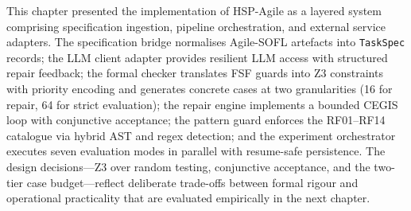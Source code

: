 This chapter presented the implementation of HSP-Agile as a layered system
comprising specification ingestion, pipeline orchestration, and external
service adapters.  The specification bridge normalises Agile-SOFL artefacts
into \texttt{TaskSpec} records; the LLM client adapter provides resilient LLM
access with structured repair feedback; the formal checker translates FSF
guards into Z3 constraints with priority encoding and generates concrete
cases at two granularities (16 for repair, 64 for strict evaluation); the
repair engine implements a bounded CEGIS loop with conjunctive acceptance;
the pattern guard enforces the RF01--RF14 catalogue via hybrid AST and regex
detection; and the experiment orchestrator executes seven evaluation modes in
parallel with resume-safe persistence.  The design decisions---Z3 over random
testing, conjunctive acceptance, and the two-tier case budget---reflect
deliberate trade-offs between formal rigour and operational practicality that
are evaluated empirically in the next chapter.
